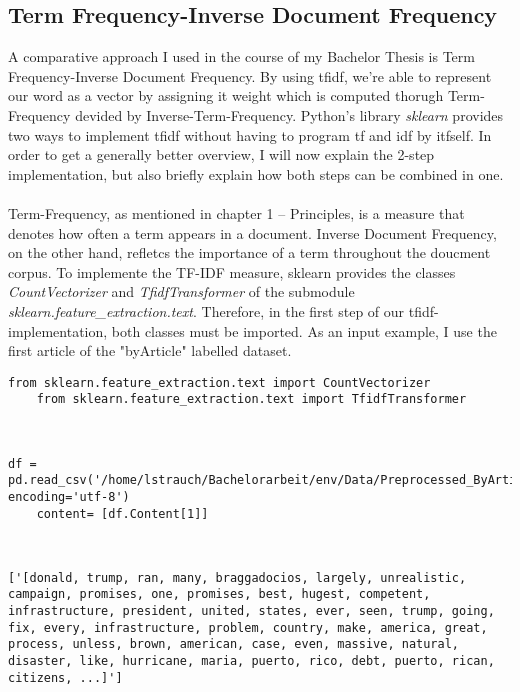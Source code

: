 \documentclass[a4paper, 11pt,titlepage,oneside,openany]{book}
\begin{document}
\subsection{Term Frequency-Inverse Document Frequency}
A comparative approach I used in the course of my Bachelor Thesis is Term Frequency-Inverse Document Frequency. By using \gls{tfidf}, we're able to represent our word as a vector by assigning it weight which is computed thorugh Term-Frequency devided by Inverse-Term-Frequency. Python's library \textit{sklearn} provides two ways to implement \gls{tfidf} without having to program \gls{tf} and \gls{idf} by itfself.
In order to get a generally better overview, I will now explain the 2-step implementation, but also briefly explain how both steps can be combined in one. \\
\\ Term-Frequency, as mentioned in chapter 1 -- Principles, is a measure that denotes how often a term appears in a document. Inverse Document Frequency, on the other hand, refletcs the importance of a term throughout the doucment corpus. To implemente the TF-IDF measure, sklearn provides the classes \textit{CountVectorizer} and \textit{TfidfTransformer} of the submodule \textit{sklearn.feature\_extraction.text}. Therefore, in the first step of our \gls{tfidf}-implementation, both classes must be imported. As an input example, I use the first article of the "byArticle" labelled dataset. \\
\noindent
\begin{minipage}{\linewidth}
	\begin{lstlisting}[frame=single]
	from sklearn.feature_extraction.text import CountVectorizer
	from sklearn.feature_extraction.text import TfidfTransformer
	\end{lstlisting}
\end{minipage}\\
\noindent
\begin{minipage}[c]{\linewidth}
	\begin{lstlisting}[frame=single]
	df = pd.read_csv('/home/lstrauch/Bachelorarbeit/env/Data/Preprocessed_ByArticle.csv', encoding='utf-8')
	content= [df.Content[1]]
	\end{lstlisting}
\end{minipage} \\
\noindent
\begin{minipage}{\linewidth}
\begin{lstlisting}
['[donald, trump, ran, many, braggadocios, largely, unrealistic, campaign, promises, one, promises, best, hugest, competent, infrastructure, president, united, states, ever, seen, trump, going, fix, every, infrastructure, problem, country, make, america, great, process, unless, brown, american, case, even, massive, natural, disaster, like, hurricane, maria, puerto, rico, debt, puerto, rican, citizens, ...]']
\end{lstlisting}
\end{minipage} \\
\end{document}
